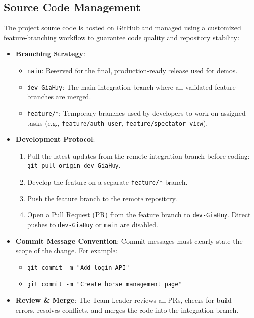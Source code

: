 \subsection{Source Code Management}

The project source code is hosted on GitHub and managed using a customized feature-branching workflow to guarantee code quality and repository stability:
\begin{itemize}
    \item \textbf{Branching Strategy}:
    \begin{itemize}
        \item \texttt{main}: Reserved for the final, production-ready release used for demos.
        \item \texttt{dev-GiaHuy}: The main integration branch where all validated feature branches are merged.
        \item \texttt{feature/*}: Temporary branches used by developers to work on assigned tasks (e.g., \texttt{feature/auth-user}, \texttt{feature/spectator-view}).
    \end{itemize}
    \item \textbf{Development Protocol}:
    \begin{enumerate}
        \item Pull the latest updates from the remote integration branch before coding: \texttt{git pull origin dev-GiaHuy}.
        \item Develop the feature on a separate \texttt{feature/*} branch.
        \item Push the feature branch to the remote repository.
        \item Open a Pull Request (PR) from the feature branch to \texttt{dev-GiaHuy}. Direct pushes to \texttt{dev-GiaHuy} or \texttt{main} are disabled.
    \end{enumerate}
    \item \textbf{Commit Message Convention}: Commit messages must clearly state the scope of the change. For example:
    \begin{itemize}
        \item \texttt{git commit -m "Add login API"}
        \item \texttt{git commit -m "Create horse management page"}
    \end{itemize}
    \item \textbf{Review \& Merge}: The Team Leader reviews all PRs, checks for build errors, resolves conflicts, and merges the code into the integration branch.
\end{itemize}
